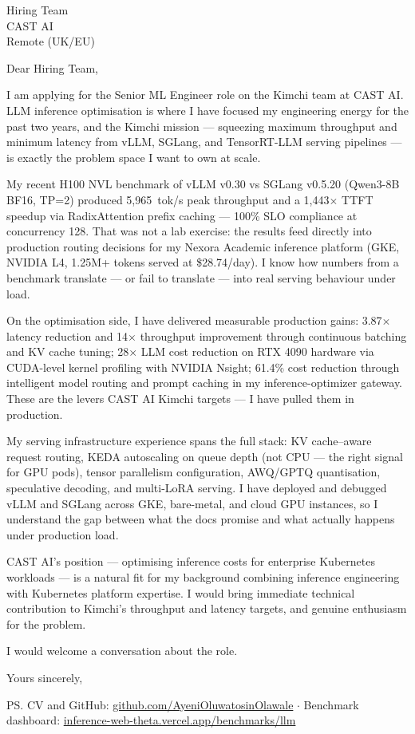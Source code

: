 \documentclass[12pt,a4paper]{letter}
\date{6 November 2026}
\begin{document}
\begin{letter}{Hiring Team \\ CAST AI \\ Remote (UK/EU)}

\opening{Dear Hiring Team,}

I am applying for the Senior ML Engineer role on the Kimchi team at CAST AI. LLM inference optimisation is where I have focused my engineering energy for the past two years, and the Kimchi mission — squeezing maximum throughput and minimum latency from vLLM, SGLang, and TensorRT-LLM serving pipelines — is exactly the problem space I want to own at scale.

My recent H100 NVL benchmark of vLLM v0.30 vs SGLang v0.5.20 (Qwen3-8B BF16, TP=2) produced 5,965~tok/s peak throughput and a 1,443$\times$ TTFT speedup via RadixAttention prefix caching — 100\% SLO compliance at concurrency 128. That was not a lab exercise: the results feed directly into production routing decisions for my Nexora Academic inference platform (GKE, NVIDIA L4, 1.25M+ tokens served at \$28.74/day). I know how numbers from a benchmark translate — or fail to translate — into real serving behaviour under load.

On the optimisation side, I have delivered measurable production gains: 3.87$\times$ latency reduction and 14$\times$ throughput improvement through continuous batching and KV cache tuning; 28$\times$ LLM cost reduction on RTX 4090 hardware via CUDA-level kernel profiling with NVIDIA Nsight; 61.4\% cost reduction through intelligent model routing and prompt caching in my inference-optimizer gateway. These are the levers CAST AI Kimchi targets — I have pulled them in production.

My serving infrastructure experience spans the full stack: KV cache–aware request routing, KEDA autoscaling on queue depth (not CPU — the right signal for GPU pods), tensor parallelism configuration, AWQ/GPTQ quantisation, speculative decoding, and multi-LoRA serving. I have deployed and debugged vLLM and SGLang across GKE, bare-metal, and cloud GPU instances, so I understand the gap between what the docs promise and what actually happens under production load.

CAST AI's position — optimising inference costs for enterprise Kubernetes workloads — is a natural fit for my background combining inference engineering with Kubernetes platform expertise. I would bring immediate technical contribution to Kimchi's throughput and latency targets, and genuine enthusiasm for the problem.

I would welcome a conversation about the role.

\closing{Yours sincerely,}

\ps{CV and GitHub: \href{https://github.com/AyeniOluwatosinOlawale}{github.com/AyeniOluwatosinOlawale} $\cdot$ Benchmark dashboard: \href{https://inference-web-theta.vercel.app/benchmarks/llm}{inference-web-theta.vercel.app/benchmarks/llm}}

\end{letter}
\end{document}
